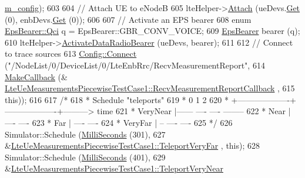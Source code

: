 \begin{DoxyCode}
      \hyperlink{classLteUeMeasurementsPiecewiseTestCase1_a3238ee6ab2ac6c4abdfa4438e9f5e3e0}{m\_config});
603 
604   \textcolor{comment}{// Attach UE to eNodeB}
605   lteHelper->\hyperlink{classns3_1_1LteHelper_a9466743f826aa2652a87907b7f0a1c87}{Attach} (ueDevs.\hyperlink{classns3_1_1NetDeviceContainer_a677d62594b5c9d2dea155cc5045f4d0b}{Get} (0), enbDevs.\hyperlink{classns3_1_1NetDeviceContainer_a677d62594b5c9d2dea155cc5045f4d0b}{Get} (0));
606 
607   \textcolor{comment}{// Activate an EPS bearer}
608   \textcolor{keyword}{enum} \hyperlink{structns3_1_1EpsBearer_aecf0c67109c5eb4ec0b07226fff5885e}{EpsBearer::Qci} q = EpsBearer::GBR\_CONV\_VOICE;
609   \hyperlink{structns3_1_1EpsBearer}{EpsBearer} bearer (q);
610   lteHelper->\hyperlink{classns3_1_1LteHelper_ac896e16cf162e4beeaa292d39ab1b700}{ActivateDataRadioBearer} (ueDevs, bearer);
611 
612   \textcolor{comment}{// Connect to trace sources}
613   \hyperlink{group__config_ga4014f151241cd0939b6cb64409605736}{Config::Connect} (\textcolor{stringliteral}{"/NodeList/0/DeviceList/0/LteEnbRrc/RecvMeasurementReport"},
614                    \hyperlink{group__makecallbackmemptr_ga9376283685aa99d204048d6a4b7610a4}{MakeCallback} (&
      \hyperlink{classLteUeMeasurementsPiecewiseTestCase1_ae988ab7a4e0a6f8065868b31429a061a}{LteUeMeasurementsPiecewiseTestCase1::RecvMeasurementReportCallback}
      ,
615                                  \textcolor{keyword}{this}));
616 
617   \textcolor{comment}{/*}
618 \textcolor{comment}{   * Schedule "teleports"}
619 \textcolor{comment}{   *          0                   1                   2}
620 \textcolor{comment}{   *          +-------------------+-------------------+---------> time}
621 \textcolor{comment}{   * VeryNear |------  ----    ----                    --------}
622 \textcolor{comment}{   *     Near |                    ----            ----}
623 \textcolor{comment}{   *      Far |                        ----    ----}
624 \textcolor{comment}{   *  VeryFar |      --    ----            ----}
625 \textcolor{comment}{   */}
626   Simulator::Schedule (\hyperlink{group__timecivil_gaf26127cf4571146b83a92ee18679c7a9}{MilliSeconds} (301),
627                        &\hyperlink{classLteUeMeasurementsPiecewiseTestCase1_a2ccd01a6f426d9cc34b5322c596c7eab}{LteUeMeasurementsPiecewiseTestCase1::TeleportVeryFar}
      , \textcolor{keyword}{this});
628   Simulator::Schedule (\hyperlink{group__timecivil_gaf26127cf4571146b83a92ee18679c7a9}{MilliSeconds} (401),
629                        &\hyperlink{classLteUeMeasurementsPiecewiseTestCase1_aa8faf751ec74daa2d3b81cb052a5e259}{LteUeMeasurementsPiecewiseTestCase1::TeleportVeryNear}

\end{DoxyCode}
